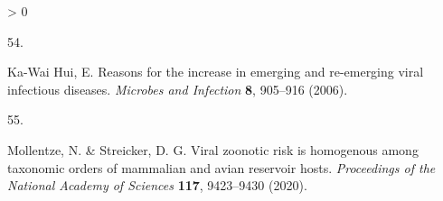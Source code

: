 \documentclass[10pt,oneside]{article}
\newlength{\cslhangindent}
\newlength{\csllabelwidth}
\newenvironment{CSLReferences}[3] %
 {%
  \setlength{\parindent}{0pt}
  \ifodd #1 \everypar{\setlength{\hangindent}{\cslhangindent}}\ignorespaces\fi
  \ifnum #2 > 0
  \setlength{\parskip}{#2\baselineskip}
  \fi
 }%
 {}
\newcommand{\CSLLeftMargin}[1]{\parbox[t]{\maxof{\widthof{#1}}{\csllabelwidth}}{#1}}
\newcommand{\CSLRightInline}[1]{\parbox[t]{\linewidth}{#1}}
\begin{document}
\begin{CSLReferences}{0}{0}
\leavevmode\hypertarget{ref-Ka-WaiHui2006Reasons}{}%
\CSLLeftMargin{54. }
\CSLRightInline{Ka-Wai Hui, E. Reasons for the increase in emerging and
re-emerging viral infectious diseases. \emph{Microbes and Infection}
\textbf{8}, 905--916 (2006).}

\leavevmode\hypertarget{ref-Mollentze2020Viral}{}%
\CSLLeftMargin{55. }
\CSLRightInline{Mollentze, N. \& Streicker, D. G. Viral zoonotic risk is
homogenous among taxonomic orders of mammalian and avian reservoir
hosts. \emph{Proceedings of the National Academy of Sciences}
\textbf{117}, 9423--9430 (2020).}

\end{CSLReferences}
\end{document}
